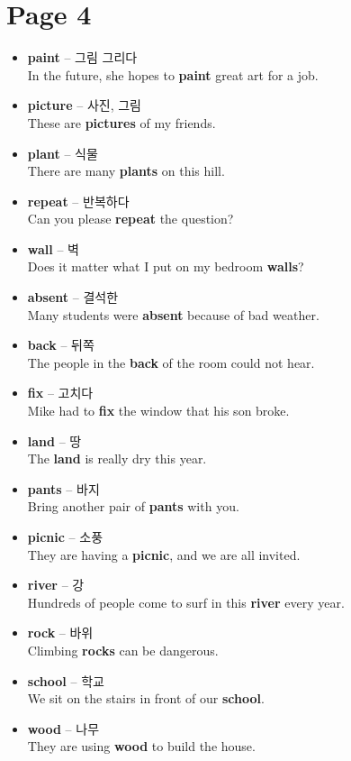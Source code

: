 \documentclass[12pt]{article}
\begin{document}
\newpage
\section*{Page 4}
\begin{itemize}
    \item \textbf{paint} -- 그림 그리다 \\
    In the future, she hopes to \textbf{paint} great art for a job.
    \item \textbf{picture} -- 사진, 그림 \\
    These are \textbf{pictures} of my friends.
    \item \textbf{plant} -- 식물 \\
    There are many \textbf{plants} on this hill.
    \item \textbf{repeat} -- 반복하다 \\
    Can you please \textbf{repeat} the question?
    \item \textbf{wall} -- 벽 \\
    Does it matter what I put on my bedroom \textbf{walls}?
    \item \textbf{absent} -- 결석한 \\
    Many students were \textbf{absent} because of bad weather.
    \item \textbf{back} -- 뒤쪽 \\
    The people in the \textbf{back} of the room could not hear.
    \item \textbf{fix} -- 고치다 \\
    Mike had to \textbf{fix} the window that his son broke.
    \item \textbf{land} -- 땅 \\
    The \textbf{land} is really dry this year.
    \item \textbf{pants} -- 바지 \\
    Bring another pair of \textbf{pants} with you.
    \item \textbf{picnic} -- 소풍 \\
    They are having a \textbf{picnic}, and we are all invited.
    \item \textbf{river} -- 강 \\
    Hundreds of people come to surf in this \textbf{river} every year.
    \item \textbf{rock} -- 바위 \\
    Climbing \textbf{rocks} can be dangerous.
    \item \textbf{school} -- 학교 \\
    We sit on the stairs in front of our \textbf{school}.
    \item \textbf{wood} -- 나무 \\
    They are using \textbf{wood} to build the house.
\end{itemize}
\end{document}
